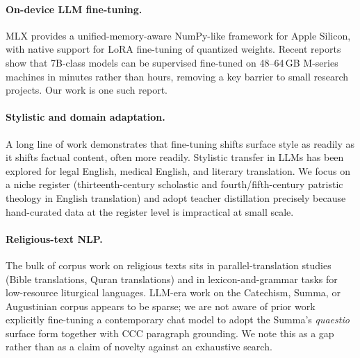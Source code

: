 \paragraph{On-device LLM fine-tuning.} MLX \cite{mlx} provides a
unified-memory-aware NumPy-like framework for Apple Silicon, with native
support for LoRA fine-tuning of quantized weights. Recent reports show
that 7B-class models can be supervised fine-tuned on 48--64\,GB M-series
machines in minutes rather than hours, removing a key barrier to small
research projects. Our work is one such report.

\paragraph{Stylistic and domain adaptation.} A long line of work
demonstrates that fine-tuning shifts surface style as readily as it shifts
factual content, often more readily. Stylistic transfer in LLMs has been
explored for legal English, medical English, and literary translation. We
focus on a niche register (thirteenth-century scholastic and
fourth/fifth-century patristic theology in English translation) and
adopt teacher distillation precisely because hand-curated data at the
register level is impractical at small scale.

\paragraph{Religious-text NLP.} The bulk of corpus work on religious texts
sits in parallel-translation studies (Bible translations, Quran translations)
and in lexicon-and-grammar tasks for low-resource liturgical languages.
LLM-era work on the Catechism, Summa, or Augustinian corpus appears to be
sparse; we are not aware of prior work explicitly fine-tuning a
contemporary chat model to adopt the Summa's \emph{quaestio} surface form
together with CCC paragraph grounding. We note this as a gap rather than
as a claim of novelty against an exhaustive search.

